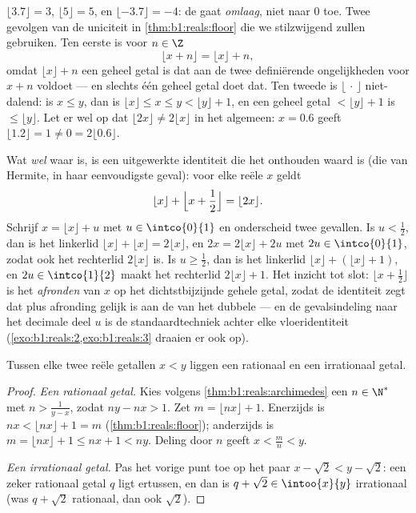 \begin{example}\label{ex:b1:reals:floorpractice}
$\lfloor 3.7 \rfloor = 3$, $\lfloor 5 \rfloor = 5$, en $\lfloor -3.7
\rfloor = -4$: de  gaat \emph{omlaag}, niet naar $0$ toe. Twee
gevolgen van de uniciteit in \cref{thm:b1:reals:floor} die we
stilzwijgend zullen gebruiken. Ten eerste is voor $n \in \Z$
\[
\lfloor x + n \rfloor = \lfloor x \rfloor + n ,
\]
omdat $\lfloor x \rfloor + n$ een geheel getal is dat aan de twee
definiërende ongelijkheden voor $x + n$ voldoet --- en slechts één geheel
getal doet dat. Ten tweede is $\lfloor \, \cdot \, \rfloor$
niet-dalend: is $x \leq y$, dan is $\lfloor x \rfloor \leq x \leq y <
\lfloor y \rfloor + 1$, en een geheel getal $< \lfloor y \rfloor + 1$ is
$\leq \lfloor y \rfloor$. Let er wel op dat $\lfloor 2x \rfloor \neq
2\lfloor x \rfloor$ in het algemeen: $x = 0.6$ geeft $\lfloor 1.2 \rfloor
= 1 \neq 0 = 2\lfloor 0.6 \rfloor$.

Wat \emph{wel} waar is, is een uitgewerkte identiteit die het onthouden
waard is (die van Hermite, in haar eenvoudigste geval): voor elke reële
$x$ geldt
\[
\lfloor x \rfloor + \Bigl\lfloor x + \frac12 \Bigr\rfloor
= \lfloor 2x \rfloor .
\]
Schrijf $x = \lfloor x\rfloor + u$ met $u \in \intco{0}{1}$ en
onderscheid twee gevallen. Is $u < \frac12$, dan is het linkerlid
$\lfloor x\rfloor + \lfloor x\rfloor = 2\lfloor x\rfloor$, en $2x =
2\lfloor x\rfloor + 2u$ met $2u \in \intco{0}{1}$, zodat ook het
rechterlid $2\lfloor x\rfloor$ is. Is $u \geq \frac12$, dan is het
linkerlid $\lfloor x\rfloor + (\lfloor x\rfloor + 1)$, en $2u \in
\intco{1}{2}$ maakt het rechterlid $2\lfloor x\rfloor + 1$. Het inzicht
tot slot: $\lfloor x + \frac12\rfloor$ is het \emph{afronden} van $x$ op
het dichtstbijzijnde gehele getal, zodat de identiteit zegt dat  plus
afronding gelijk is aan de  van het dubbele --- en de gevalsindeling
naar het decimale deel $u$ is de standaardtechniek achter elke
vloeridentiteit (\cref{exo:b1:reals:2,exo:b1:reals:3} draaien er ook op).
\end{example}

\begin{theorem}\label{thm:b1:reals:density}
Tussen elke twee reële getallen $x < y$ liggen een rationaal en een
irrationaal getal.
\end{theorem}

\begin{proof}
\emph{Een rationaal getal.} Kies volgens \cref{thm:b1:reals:archimedes}
een $n \in \N^*$ met $n > \frac{1}{y - x}$, zodat $ny - nx > 1$. Zet $m =
\lfloor nx \rfloor + 1$. Enerzijds is $nx < \lfloor nx \rfloor + 1 = m$
(\cref{thm:b1:reals:floor}); anderzijds is $m = \lfloor nx \rfloor + 1
\leq nx + 1 < ny$. Deling door $n$ geeft $x < \frac mn < y$.

\emph{Een irrationaal getal.} Pas het vorige punt toe op het paar $x -
\sqrt 2 < y - \sqrt 2$: een zeker rationaal getal $q$ ligt ertussen, en
dan is $q + \sqrt 2 \in \intoo{x}{y}$ irrationaal (was $q + \sqrt 2$
rationaal, dan ook $\sqrt 2$).
\end{proof}

